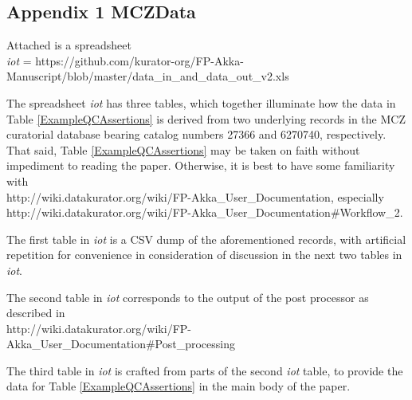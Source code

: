 \begin{appendices}
\large
\section*{Appendix 1 MCZData}
\normalsize
Attached is a spreadsheet
\\\textit{iot} = https://github.com/kurator-org/FP-Akka-Manuscript/blob/master/data\_in\_and\_data\_out\_v2.xls 


The spreadsheet \textit{iot} has three tables, which together illuminate how the data 
in Table \ref{ExampleQCAssertions} is derived from two underlying records in the MCZ curatorial database bearing catalog numbers 27366 and 6270740, respectively. That said, Table \ref{ExampleQCAssertions} may be taken on faith without impediment to reading the paper. Otherwise, it is best to have some familiarity with 
\\http://wiki.datakurator.org/wiki/FP-Akka\_User\_Documentation, especially 
\\http://wiki.datakurator.org/wiki/FP-Akka\_User\_Documentation\#Workflow\_2.

The first table in \textit{iot} is a CSV dump of the aforementioned records, with artificial repetition for convenience in consideration of discussion in the next two tables in \textit{iot}.

The second table in \textit{iot} corresponds to the output of the post processor as described in
\\http://wiki.datakurator.org/wiki/FP-Akka\_User\_Documentation\#Post\_processing

The third table in \textit{iot} is crafted from parts of the second  \textit{iot} table, 
to provide the data for Table \ref{ExampleQCAssertions} in the main body of the paper.



\end{appendices}
